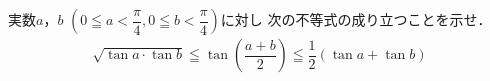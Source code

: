 \documentclass[../../main.tex]{subfiles}
\begin{document}
実数$a$，$b$ $\displaystyle \left( 0 \leqq a < \dfrac{\pi}{4} , 0 \leqq b < \dfrac{\pi}{4} \right)$に対し
次の不等式の成り立つことを示せ．
\begin{align*}
  \sqrt{\tan a \cdot \tan b} \leqq \tan \left( \dfrac{a+b}{2} \right) \leqq \dfrac{1}{2}(\tan a + \tan b)
\end{align*}
\end{document}
